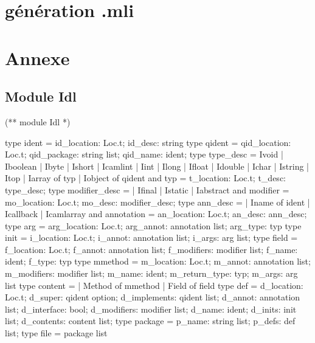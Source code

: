 \documentclass[a4paper, 11pt]{report}
\begin{document}
\section{génération .mli}
 














\newpage
\section*{Annexe}
\subsection*{Module Idl}
\begin{multicols}{2}
\begin{OCaml}
(**  module Idl  *)

type ident = {
    id_location: Loc.t;
    id_desc: string 
  }
type qident = {
    qid_location: Loc.t;
    qid_package: string list;
    qid_name: ident;
  }
type type_desc = 
    Ivoid  
  | Iboolean
  | Ibyte
  | Ishort
  | Icamlint
  | Iint
  | Ilong
  | Ifloat
  | Idouble
  | Ichar
  | Istring
  | Itop
  | Iarray of typ
  | Iobject of qident
and typ = {
    t_location: Loc.t;
    t_desc: type_desc;
  }
type modifier_desc = 
  | Ifinal 
  | Istatic 
  | Iabstract
and modifier = {
    mo_location: Loc.t; 
    mo_desc: modifier_desc;
}
type ann_desc =
  | Iname of ident
  | Icallback
  | Icamlarray
and annotation = {
    an_location: Loc.t; 
    an_desc: ann_desc;
}
type arg = {
    arg_location: Loc.t; 
    arg_annot: annotation list;
    arg_type: typ
}   
type init = {
    i_location: Loc.t;
    i_annot: annotation list; 
    i_args: arg list;
}   
type field = {
    f_location: Loc.t;
    f_annot: annotation list; 
    f_modifiers: modifier list;
    f_name: ident;
    f_type: typ
}
type mmethod = { 
    m_location: Loc.t;
    m_annot: annotation list;
    m_modifiers: modifier list;
    m_name: ident;
    m_return_type: typ;
    m_args: arg list
}
type content = 
    | Method of mmethod 
    | Field of field
type def = {
    d_location: Loc.t;
    d_super: qident option;
    d_implements: qident list;
    d_annot: annotation list;
    d_interface: bool;
    d_modifiers: modifier list;
    d_name: ident;
    d_inits: init list;
    d_contents: content list;
}
type package = {
    p_name: string list;
    p_defs: def list;
}   
type file = package list
 
\end{OCaml}
\end{multicols}
\end{document}
